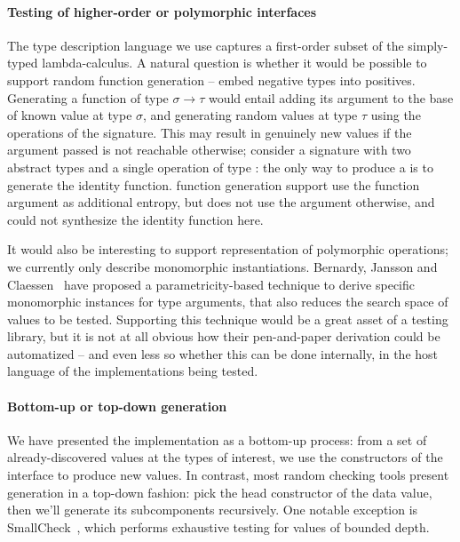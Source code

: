 \paragraph{Testing of higher-order or polymorphic interfaces}

The type description language we use captures a first-order subset of
the simply-typed lambda-calculus. A natural question is whether it
would be possible to support random function generation -- embed
negative types into positives. Generating a function of type $\sigma
\to \tau$ would entail adding its argument to the base of known value
at type $\sigma$, and generating random values at type $\tau$ using
the operations of the signature. This may result in genuinely new
values if the argument passed is not reachable otherwise; consider
a signature with two abstract types  and a single operation
of type : the only way to produce a  is to
generate the identity function. \qcheck function generation support
use the function argument as additional entropy, but does not use the
argument otherwise, and could not synthesize the identity function here.

It would also be interesting to support representation of polymorphic
operations; we currently only describe monomorphic
instantiations. Bernardy, Jansson and
Claessen~\cite{DBLP:conf/esop/BernardyJC10} have proposed
a parametricity-based technique to derive specific monomorphic
instances for type arguments, that also reduces the search space of
values to be tested. Supporting this technique would be a great asset
of a testing library, but it is not at all obvious how their
pen-and-paper derivation could be automatized -- and even less so
whether this can be done internally, in the host language of the
implementations being tested.

\paragraph{Bottom-up or top-down generation}

We have presented the  implementation as a bottom-up
process: from a set of already-discovered values at the types of
interest, we use the constructors of the interface to produce new
values. In contrast, most random checking tools present generation in
a top-down fashion: pick the head constructor of the data value, then
we'll generate its subcomponents recursively. One notable exception is
SmallCheck~\cite{DBLP:conf/haskell/RuncimanNL08}, which performs
exhaustive testing for values of bounded depth.

